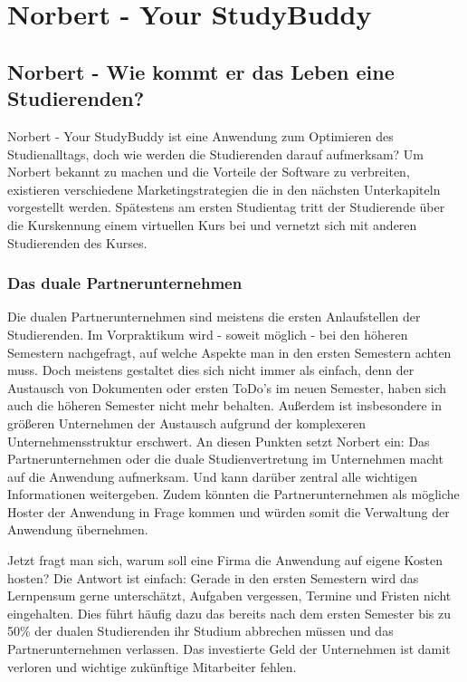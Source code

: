 
\chapter{Norbert - Your StudyBuddy}

\section{Norbert - Wie kommt er das Leben eine Studierenden?}
Norbert - Your StudyBuddy ist eine Anwendung zum Optimieren des Studienalltags, doch wie werden die Studierenden darauf aufmerksam?
Um Norbert bekannt zu machen und die Vorteile der Software zu verbreiten, existieren verschiedene Marketingstrategien die in den nächsten Unterkapiteln vorgestellt werden. Spätestens am ersten Studientag tritt der Studierende über die Kurskennung einem virtuellen Kurs bei und vernetzt sich mit anderen Studierenden des Kurses.

\subsection{Das duale Partnerunternehmen}
Die dualen Partnerunternehmen sind meistens die ersten Anlaufstellen der Studierenden. Im Vorpraktikum wird  - soweit möglich - bei den höheren Semestern nachgefragt, auf welche Aspekte man in den ersten Semestern achten muss. Doch meistens gestaltet dies sich nicht immer als einfach, denn der Austausch von Dokumenten oder ersten ToDo's im neuen Semester, haben sich auch die höheren Semester nicht mehr behalten. Außerdem ist insbesondere in größeren Unternehmen der Austausch aufgrund der komplexeren Unternehmensstruktur erschwert. An diesen Punkten setzt Norbert ein: Das Partnerunternehmen oder die duale Studienvertretung im Unternehmen macht auf die Anwendung aufmerksam. Und kann darüber zentral alle wichtigen Informationen weitergeben. Zudem könnten die Partnerunternehmen als mögliche Hoster der Anwendung in Frage kommen und würden somit die Verwaltung der Anwendung übernehmen.

Jetzt fragt man sich, warum soll eine Firma die Anwendung auf eigene Kosten hosten? Die Antwort ist einfach: Gerade in den ersten Semestern wird das Lernpensum gerne unterschätzt, Aufgaben vergessen, Termine und Fristen nicht eingehalten. Dies führt häufig dazu das bereits nach dem ersten Semester bis zu 50\% der dualen Studierenden ihr Studium abbrechen müssen und das Partnerunternehmen verlassen. Das investierte Geld der Unternehmen ist damit verloren und wichtige zukünftige Mitarbeiter fehlen.

